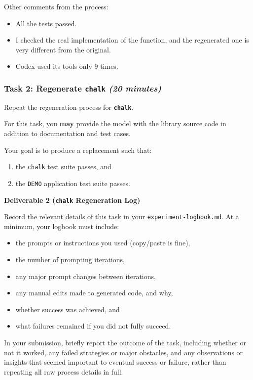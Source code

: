\begin{tcolorbox}[colback=blue!10,colframe=blue!70!black,boxrule=0.5pt]
Other comments from the process:
\begin{itemize}
    \item All the tests passed.
    \item I checked the real implementation of the function, and the regenerated one is very different from the original.
    \item Codex used its tools only 9 times.
    
\end{itemize}
\end{tcolorbox}

\subsubsection{Task 2: Regenerate \texttt{chalk} \textnormal{\textit{(20 minutes)}}}

Repeat the regeneration process for \textbf{\texttt{chalk}}.

For this task, you \textbf{may} provide the model with the library source code in addition to
documentation and test cases.

Your goal is to produce a replacement such that:
\begin{enumerate}
    \item the \texttt{chalk} test suite passes, and
    \item the \texttt{DEMO} application test suite passes.
\end{enumerate}

\begin{tcolorbox}[colback=yellow!10,colframe=black,boxrule=0.5pt]
\textbf{Deliverable 2 (\texttt{chalk} Regeneration Log)}

Record the relevant details of this task in your \texttt{experiment-logbook.md}.
At a minimum, your logbook must include:
\begin{itemize}
    \item the prompts or instructions you used (copy/paste is fine),
    \item the number of prompting iterations,
    \item any major prompt changes between iterations,
    \item any manual edits made to generated code, and why,
    \item whether success was achieved, and
    \item what failures remained if you did not fully succeed.
\end{itemize}
In your submission, briefly report the outcome of the task, including whether or not it worked, any failed strategies or major obstacles, and any observations or insights that seemed important to eventual success or failure, rather than repeating all raw process details in full.
\end{tcolorbox}

